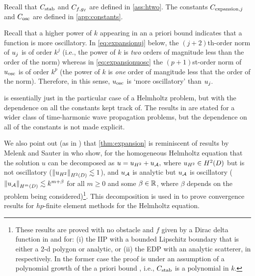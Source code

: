 Recall that $C_{\mathrm{stab}}$ and $C_{f,g_{I}}$ are defined in \cref{ass:htwo}. The constants $C_{\mathrm{expansion},j}$ and $C_{\mathrm{osc}}$ are defined in \cref{app:constants}.

\label{rem:osc}
Recall that a higher power of $k$ appearing in an a priori bound indicates that a function is more oscillatory. In \cref{eq:expansionuj} below, the $(j+2)$th-order norm of $u_{j}$ is of order $k^j$ (i.e., the power of $k$ is \emph{two} orders of magnitude less than the order of the norm) whereas in \cref{eq:expansionuosc} the $(p+1)$st-order norm of $u_{\mathrm{osc}}$ is of order $k^p$ (the power of $k$ is \emph{one} order of mangitude less that the order of the norm). Therefore, in this sense, $u_{\mathrm{osc}}$ is `more oscillatory' than $u_{j}.$
\ere

 is essentially just \cite[Theorem 1]{ChNi:19} in the particular case of a Helmholtz problem, but with the dependence on all the constants kept track of. The results in \cite{ChNi:19} are stated for a wider class of time-harmonic wave propagation problems, but the dependence on all of the constants is not made explicit.

We also point out (as in \cite[Section 7]{ChNi:19}) that \cref{thm:expansion} is reminiscent of results by Melenk and Sauter in \cite{MeSa:10,MeSa:11} who show, for the homogeneous Helmholtz equation that the solution $u$ can be decomposed as $u = u_{H^{2}} + u_{\mathcal A},$ where $\uHt \in \HtD$ but is not oscillatory ($\NHtD{\uHt} \lesssim 1$), and $u_{\mathcal A}$ is analytic but $u_{\mathcal A}$ is oscillatory ($\NHmD{\uA} \lesssim k^{m+\beta}$ for all $m\geq 0$ and some $\beta \in \mathbb R$, where $\beta$ depends on the problem being considered)\footnote{These results are proved with no obstacle and $f$ given by a Dirac delta function in \cite[Lemma 3.5]{MeSa:10} and for: (i) the IIP with a bounded Lipschitz boundary that is either a 2-d polygon or analytic, or (ii) the EDP with an analytic scatterer, in \cite[Theorems 4.10, 4.20]{MeSa:11} respectively. In the former case the proof is under an assumption of a polynomial growth of the a priori bound \cite[Assumption 4.8]{MeSa:11}, i.e., $C_{\mathrm{stab}}$ is a polynomial in $k$.}. This decomposition is used in \cite{MeSa:10,MeSa:11} to prove convergence results for $hp$-finite element methods for the Helmholtz equation. %


